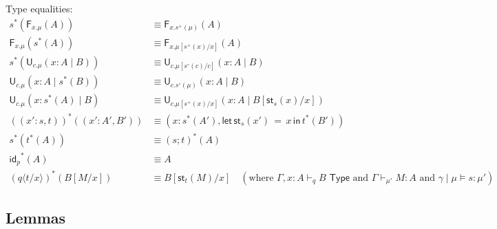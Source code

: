 \documentclass[10pt]{article}
\theoremstyle{definition}
\newcommand{\TYPE}{\,\,\mathsf{Type}}
\newcommand\F[2]{\ensuremath{\mathsf{F}_{#1}(#2)}}
\newcommand\U[3]{\ensuremath{\mathsf{U}_{#1}(#2 \mid #3)}}
\newcommand\St[2]{\ensuremath{{#1}^*(#2)}}
\newcommand\StI[2]{\ensuremath{\mathsf{st}_{#1}(#2)}}
\newcommand\StE[4]{\ensuremath{\mathsf{let} \, \StI{#1}{#3} \, = \, {#2} \, \mathsf{in} \, #4}}
\newcommand\TermTwo[4]{\ensuremath{#1 \mid #3 \vDash #2 : #4}}
\newcommand\TrPlus[2]{\ensuremath{{#1}^+(#2)}}
\newcommand\TrCirc[2]{\ensuremath{{#1}^\circ(#2)}}
\newcommand{\id}{\mathsf{id}}
\newcommand\ap[2]{\ensuremath{#1 \langle #2 \rangle }}
\newcommand{\telety}[3]{\ensuremath{(#1{:}#2,#3)}}
\begin{document}
Type equalities:
\begin{align*}
\St{s}{\F{x.\mu}{A}} &\equiv \F{x.\TrPlus{s}{\mu}}{A} \\
\F{x.\mu}{\St{s}{A}} &\equiv \F{x.\mu[\TrPlus{s}{x}/x]}{A} \\
\St{s}{\U{c.\mu}{x:A}{B}} &\equiv \U{c.\mu[\TrCirc{s}{c}/c]}{x:A}{B} \\
\U{c.\mu}{x:A}{\St{s}{B}} &\equiv \U{c.\TrCirc{s}{\mu}}{x:A}{B} \\
\U{c.\mu}{x:\St{s}{A}}{B} &\equiv \U{c.\mu[\TrPlus{s}{x}/x]}{x:A}{B[\StI{s}{x}/x]} \\
\St{(\telety{x'}{s}{t})}{\telety{x'}{A'}{B'}} & \equiv \telety{x}{\St{s}{A'}}{\StE{s}{x}{x'}{\St{t}{B'}}} \\
\St{s}{\St{t}{A}} &\equiv \St{(s;t)}{A} \\
\St{\id_p}{A} &\equiv A\\
\St{(\ap{q}{t/x})}{B[M/x]} & \equiv B[\StI{t}{M}/x] \quad (\text{where }
\Gamma,x:A \vdash_q B \TYPE \text{ and } \Gamma \vdash_{\mu'} M : A \text{ and }
\TermTwo{\gamma}{s}{\mu}{\mu'})
\end{align*}

\subsection{Lemmas}
\end{document}
